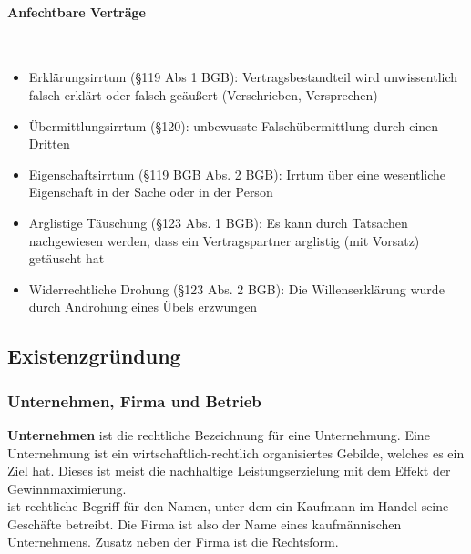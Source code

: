 \paragraph{Anfechtbare Verträge}~\\

\begin{itemize}
\setlength\itemsep{0em}
	\item Erklärungsirrtum (§119 Abs 1 BGB): Vertragsbestandteil wird unwissentlich falsch erklärt oder falsch geäußert (Verschrieben, Versprechen)
	\item Übermittlungsirrtum (§120): unbewusste Falschübermittlung durch einen Dritten
	\item Eigenschaftsirrtum (§119 BGB Abs. 2 BGB): Irrtum über eine wesentliche Eigenschaft in der Sache oder in der Person
	\item Arglistige Täuschung (§123 Abs. 1 BGB): Es kann durch Tatsachen nachgewiesen werden, dass ein Vertragspartner arglistig (mit Vorsatz) getäuscht hat
	\item Widerrechtliche Drohung (§123 Abs. 2 BGB): Die Willenserklärung wurde durch Androhung eines Übels erzwungen
\end{itemize}


\subsection{Existenzgründung}

\subsubsection{Unternehmen, Firma und Betrieb}

{\bf Unternehmen} ist die rechtliche Bezeichnung für eine Unternehmung. Eine 	Unternehmung ist ein wirtschaftlich-rechtlich organisiertes Gebilde, welches es ein Ziel hat. Dieses ist meist die nachhaltige Leistungserzielung mit dem Effekt der Gewinnmaximierung.\\

 ist rechtliche Begriff für den Namen, unter dem ein Kaufmann im Handel seine Geschäfte betreibt. Die Firma ist also der Name eines kaufmännischen Unternehmens. Zusatz neben der Firma ist die Rechtsform.\\

